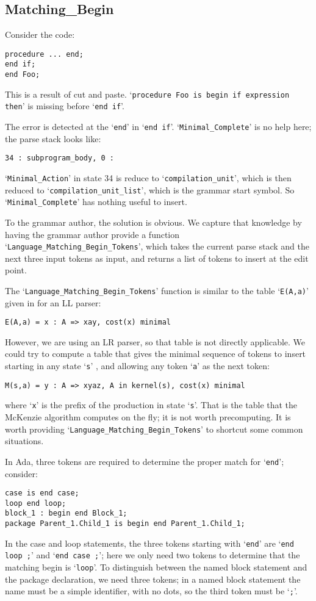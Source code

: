 \documentclass{article}
\newcommand{\code}[1]{`{\tt #1}'}
\begin{document}
\subsection{Matching\_Begin}
Consider the code:
\begin{verbatim}
procedure ... end;
end if;
end Foo;
\end{verbatim}
This is a result of cut and paste.
\code{procedure Foo is begin if expression then} is missing before
\code{end if}.

The error is detected at the \code{end} in \code{end if}.
\code{Minimal\_Complete} is no help here; the parse stack looks like:
\begin{verbatim}
34 : subprogram_body, 0 :
\end{verbatim}
\code{Minimal\_Action} in state 34 is reduce to
\code{compilation\_unit}, which is then reduced to
\code{compilation\_unit\_list}, which is the grammar start symbol. So
\code{Minimal\_Complete} has nothing useful to insert.

To the grammar author, the solution is obvious. We capture that
knowledge by having the grammar author provide a function
\code{Language\_Matching\_Begin\_Tokens}, which takes the current parse
stack and the next three input tokens as input, and returns a list of
tokens to insert at the edit point.

The \code{Language\_Matching\_Begin\_Tokens} function is similar to the
table \code{E(A,a)} given in \cite{FMQ 1980} for an LL parser:
\begin{verbatim}
E(A,a) = x : A => xay, cost(x) minimal
\end{verbatim}
However, we are using an LR parser, so that table is not directly
applicable. We could try to compute a table that gives the minimal
sequence of tokens to insert starting in any state \code{s} , and
allowing any token \code{a} as the next token:
\begin{verbatim}
M(s,a) = y : A => xyaz, A in kernel(s), cost(x) minimal
\end{verbatim}
where \code{x} is the prefix of the production in state \code{s}.
That is the table that the McKenzie algorithm computes on the fly; it
is not worth precomputing. It is worth providing
\code{Language\_Matching\_Begin\_Tokens} to shortcut some common
situations.

In Ada, three tokens are required to determine the proper match for
\code{end}; consider:
\begin{verbatim}
case is end case;
loop end loop;
block_1 : begin end Block_1;
package Parent_1.Child_1 is begin end Parent_1.Child_1;
\end{verbatim}
In the case and loop statements, the three tokens starting with
\code{end} are \code{end loop ;} and \code{end case ;}; here we only
need two tokens to determine that the matching begin is \code{loop}.
To distinguish between the named block statement and the package
declaration, we need three tokens; in a named block statement the name
must be a simple identifier, with no dots, so the third token must be
\code{;}.
\end{document}

